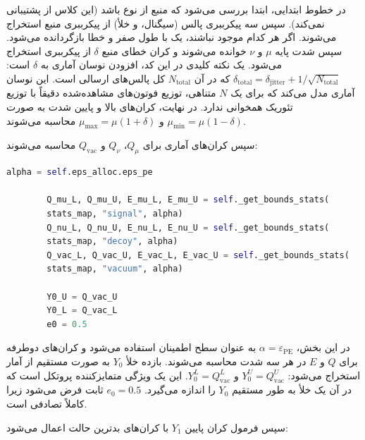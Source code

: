 در خطوط ابتدایی، ابتدا بررسی می‌شود که منبع از نوع  باشد (این کلاس از  پشتیبانی نمی‌کند). سپس سه پیکرببری پالس (سیگنال،  و خلأ) از پیکرببری منبع استخراج می‌شوند. اگر هر کدام موجود نباشند، یک  با طول صفر و  خطا بازگردانده می‌شود. سپس شدت پایه $\mu$ و $\nu$ خوانده می‌شوند و کران خطای منبع $\delta$ از پیکرببری استخراج می‌شود. یک نکته کلیدی در این کد، افزودن نوسان آماری به $\delta$ است: $\delta_{\text{total}} = \delta_{\text{jitter}} + 1/\sqrt{N_{\text{total}}}$ که در آن $N_{\text{total}}$ کل پالس‌های ارسالی است. این نوسان آماری مدل می‌کند که برای یک $N$ متناهی، توزیع فوتون‌های مشاهده‌شده دقیقاً با توزیع تئوریک همخوانی ندارد. در نهایت، کران‌های بالا و پایین شدت به صورت $\mu_{\min} = \mu(1 - \delta)$ و $\mu_{\max} = \mu(1 + \delta)$ محاسبه می‌شوند.

سپس کران‌های آماری برای $Q_\mu$، $Q_\nu$ و $Q_{\text{vac}}$ محاسبه می‌شوند:

\begin{LTR}
	\begin{lstlisting}[language=Python]
		alpha = self.eps_alloc.eps_pe
		
		Q_mu_L, Q_mu_U, E_mu_L, E_mu_U = self._get_bounds_stats(
		stats_map, "signal", alpha)
		Q_nu_L, Q_nu_U, E_nu_L, E_nu_U = self._get_bounds_stats(
		stats_map, "decoy", alpha)
		Q_vac_L, Q_vac_U, E_vac_L, E_vac_U = self._get_bounds_stats(
		stats_map, "vacuum", alpha)
		
		Y0_U = Q_vac_U
		Y0_L = Q_vac_L
		e0 = 0.5
	\end{lstlisting}
\end{LTR}

در این بخش، $\alpha = \varepsilon_{\text{PE}}$ به عنوان سطح اطمینان استفاده می‌شود و کران‌های دوطرفه برای $Q$ و $E$ در هر سه شدت محاسبه می‌شوند. بازده خلأ $Y_0$ به صورت مستقیم از آمار  استخراج می‌شود: $Y_0^U = Q_{\text{vac}}^U$ و $Y_0^L = Q_{\text{vac}}^L$. این یک ویژگی متمایزکننده پروتکل  است که در آن یک  خلأ به طور مستقیم $Y_0$ را اندازه می‌گیرد. $e_0 = 0.5$ ثابت فرض می‌شود زیرا  کاملاً تصادفی است.

سپس فرمول کران پایین $Y_1$ با کران‌های بدترین حالت اعمال می‌شود:

